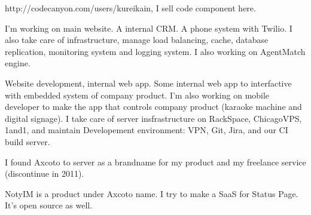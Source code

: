 \documentclass[11pt]{article}
\begin{document}
\ind http://codecanyon.com/users/kureikain, I sell code component here.

\bigskip


\medskip


\noindent I'm working on main website. A internal CRM. A phone system with Twilio. I also take care of infrastructure, manage load balancing, cache, database replication, monitoring system and logging system. I also working on AgentMatch engine.

\bigskip


\noindent Website development, internal web app. Some internal web app to interfactive with embedded system of company product. I'm also working on mobile developer to make the app that controls company product (karaoke machine and digital signage). I take care of server insfrastructure on RackSpace, ChicagoVPS, 1and1, and maintain Developement environment: VPN, Git, Jira, and our CI build server.

\bigskip


\noindent I found Axcoto to server as a brandname for my product and my freelance service (discontinue in 2011). 


\noindent NotyIM is a product under Axcoto name. I try to make a SaaS for Status Page. It's open source as well. 

\newpage
\end{document}
